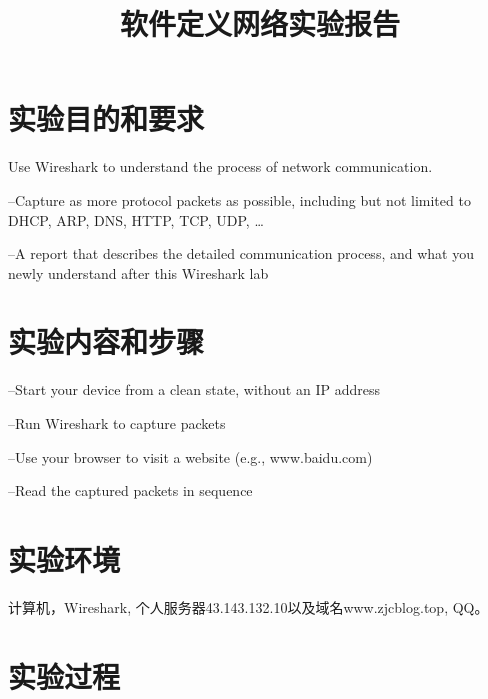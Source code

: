 \documentclass{xjtureport}
\title{软件定义网络实验报告}
\date{\zhtoday}
\begin{document}
\makecover
\makeheader


\section{实验目的和要求}
Use Wireshark to understand the process of network communication.\par
–Capture as more protocol packets as possible, including but not limited to DHCP, ARP, DNS, HTTP, TCP, UDP, …\par
–A report that describes the detailed communication process, and what you newly understand after this Wireshark lab
\section{实验内容和步骤}
–Start your device from a clean state, without an IP address\par
–Run Wireshark to capture packets\par
–Use your browser to visit a website (e.g., www.baidu.com)\par
–Read the captured packets in sequence\par
\section{实验环境}
计算机，Wireshark, 个人服务器43.143.132.10以及域名www.zjcblog.top, QQ。
\section{实验过程}
\end{document}
